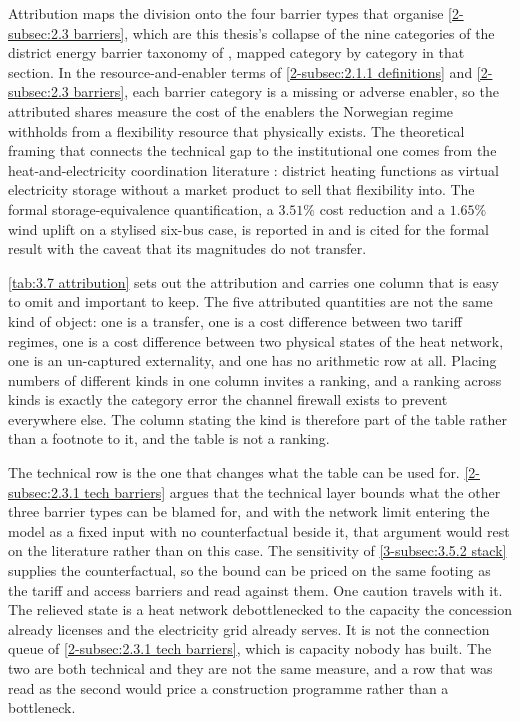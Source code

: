 Attribution maps the division onto the four barrier types that organise \autoref{2-subsec:2.3 barriers}, which are this thesis's collapse of the nine categories of the district energy barrier taxonomy of \cite{sneum_barriers_2021}, mapped category by category in that section. In the resource-and-enabler terms of \autoref{2-subsec:2.1.1 definitions} and \autoref{2-subsec:2.3 barriers}, each barrier category is a missing or adverse enabler, so the attributed shares measure the cost of the enablers the Norwegian regime withholds from a flexibility resource that physically exists. The theoretical framing that connects the technical gap to the institutional one comes from the heat-and-electricity coordination literature \cite{mitridati_heat_2020}: district heating functions as virtual electricity storage without a market product to sell that flexibility into. The formal storage-equivalence quantification, a $3.51\%$ cost reduction and a $1.65\%$ wind uplift on a stylised six-bus case, is reported in \cite{mitridati_power_2018} and is cited for the formal result with the caveat that its magnitudes do not transfer.

\autoref{tab:3.7 attribution} sets out the attribution and carries one column that is easy to omit and important to keep. The five attributed quantities are not the same kind of object: one is a transfer, one is a cost difference between two tariff regimes, one is a cost difference between two physical states of the heat network, one is an un-captured externality, and one has no arithmetic row at all. Placing numbers of different kinds in one column invites a ranking, and a ranking across kinds is exactly the category error the channel firewall exists to prevent everywhere else. The column stating the kind is therefore part of the table rather than a footnote to it, and the table is not a ranking.

The technical row is the one that changes what the table can be used for. \autoref{2-subsec:2.3.1 tech barriers} argues that the technical layer bounds what the other three barrier types can be blamed for, and with the network limit entering the model as a fixed input with no counterfactual beside it, that argument would rest on the literature rather than on this case. The sensitivity of \autoref{3-subsec:3.5.2 stack} supplies the counterfactual, so the bound can be priced on the same footing as the tariff and access barriers and read against them. One caution travels with it. The relieved state is a heat network debottlenecked to the capacity the concession already licenses and the electricity grid already serves. It is not the connection queue of \autoref{2-subsec:2.3.1 tech barriers}, which is capacity nobody has built. The two are both technical and they are not the same measure, and a row that was read as the second would price a construction programme rather than a bottleneck.

